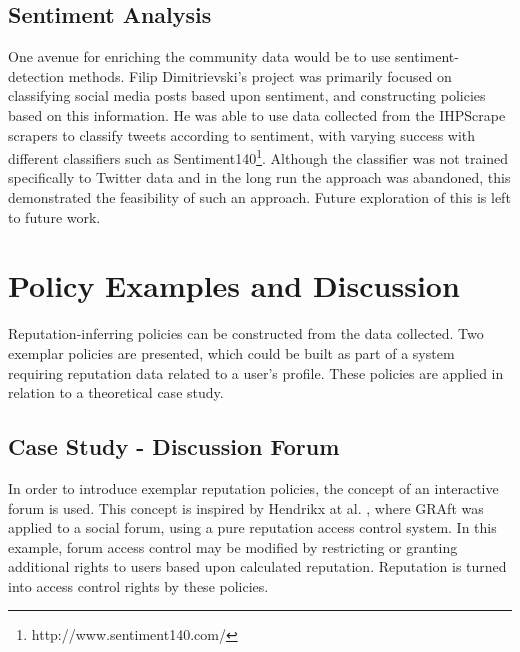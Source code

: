 
\subsection{Sentiment Analysis}

One avenue for enriching the community data would be to use sentiment-detection methods. Filip Dimitrievski's project was primarily focused on classifying social media posts based upon sentiment, and constructing policies based on this information. He was able to use data collected from the IHPScrape scrapers to classify tweets according to sentiment, with varying success with different classifiers such as Sentiment140\footnote{http://www.sentiment140.com/}. Although the classifier was not trained specifically to Twitter data and in the long run the approach was abandoned, this demonstrated the feasibility of such an approach. Future exploration of this is left to future work.


\section{Policy Examples and Discussion}

Reputation-inferring policies can be constructed from the data collected. Two exemplar policies are presented, which could be built as part of a system requiring reputation data related to a user's profile. These policies are applied in relation to a theoretical case study.


\subsection{Case Study - Discussion Forum}

In order to introduce exemplar reputation policies, the concept of an interactive forum is used. This concept is inspired by Hendrikx at al. \cite{graft_paper}, where GRAft was applied to a social forum, using a pure reputation access control system. In this example, forum access control may be modified by restricting or granting additional rights to users based upon calculated reputation. Reputation is turned into access control rights by these policies.

